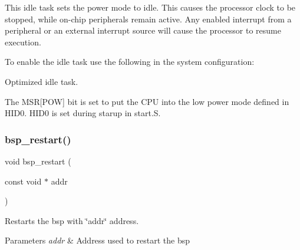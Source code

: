 This idle task sets the power mode to idle. This causes the processor clock to be stopped, while on-\/chip peripherals remain active. Any enabled interrupt from a peripheral or an external interrupt source will cause the processor to resume execution.

To enable the idle task use the following in the system configuration\+:


\begin{DoxyCode}{0}
\DoxyCodeLine{\textcolor{preprocessor}{\#include <bsp.h>}}
\DoxyCodeLine{}
\DoxyCodeLine{\textcolor{preprocessor}{\#define CONFIGURE\_INIT}}
\DoxyCodeLine{}
\DoxyCodeLine{\textcolor{preprocessor}{\#define CONFIGURE\_IDLE\_TASK\_BODY bsp\_idle\_thread}}
\DoxyCodeLine{}
\end{DoxyCode}


Optimized idle task.

The M\+SR\mbox{[}P\+OW\mbox{]} bit is set to put the C\+PU into the low power mode defined in H\+I\+D0. H\+I\+D0 is set during starup in start.\+S. \mbox{\label{group__RTEMSBSPsARMLPC176X_ga08ef43e56b67c49881940f59129113aa}} 
\subsubsection{\texorpdfstring{bsp\_restart()}{bsp\_restart()}}
{\footnotesize\ttfamily void bsp\+\_\+restart (\begin{DoxyParamCaption}\item[{const void $\ast$}]{addr }\end{DoxyParamCaption})}



Restarts the bsp with \char`\"{}addr\char`\"{} address. 


\begin{DoxyParams}{Parameters}
{\em addr} & Address used to restart the bsp \\
\hline
\end{DoxyParams}
